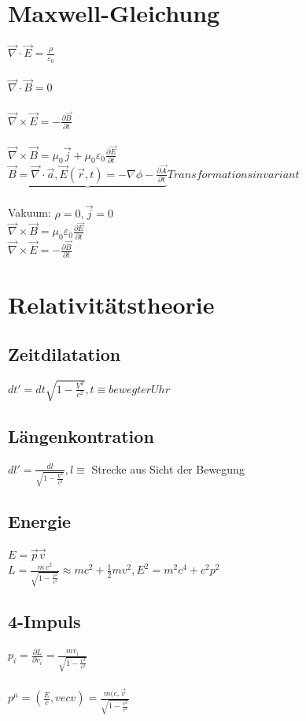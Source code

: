 \documentclass[10pt,a4paper]{article}
\begin{document}
\section{Maxwell-Gleichung}
$\vec\nabla\cdot\vec{E}= \frac{\rho}{\varepsilon_0}$\\
%
\\
$\vec\nabla\cdot\vec{B}=0$\\
%
\\
$\vec\nabla\times\vec{E}=-\frac{\partial\vec{B}}{\partial t}$\\
%
\\
$\vec\nabla\times\vec{B}= \mu_0\vec{j}+\mu_0\varepsilon_0\frac{\partial\vec{E}}{\partial t}$\\
%
$\underbrace{\vec{B}=\vec\nabla\cdot\vec{a},\vec{E}(\vec{r},t) = -\nabla\phi - \frac{\partial \vec{A}}{\partial t}}{Transformationsinvariant}$\\
%
\\
Vakuum: $\rho = 0, \vec{j}=0$\\
$\vec\nabla\times\vec{B}=\mu_0\varepsilon_0\frac{\partial\vec{E}}{\partial t}$\\
$\vec\nabla\times\vec{E}=-\frac{\partial\vec{B}}{\partial t}$\\


\section{Relativitätstheorie}
\subsection{Zeitdilatation}
$dt'=dt\sqrt{1-\frac{V^2}{c^2}}, t \equiv bewegter Uhr$\\
%
\subsection{Längenkontration}
$dl'= \frac{dl}{\sqrt{1-\frac{V^2}{c^2}}}, l \equiv$ Strecke aus Sicht der Bewegung\\
%
\subsection{Energie}
$E=\vec{p}\vec{v}$\\
$L=\frac{m \, c^2}{\sqrt{1-\frac{v^2}{c^2}}}\approx mc^2+\frac{1}{2}mv^2, E^2= m^2c^4+c^2p^2$\\
%
\subsection{4-Impuls}
$p_i=\frac{\partial L}{\partial v_i}= \frac{mv_i}{\sqrt{1-\frac{v^2}{c^2}}}$\\
%
\\
$p^\mu = (\frac{E}{c},vec{v})= \frac{m(c,\vec{v}}{\sqrt{1-\frac{v^2}{c^2}}}$\\
%
\end{document}
